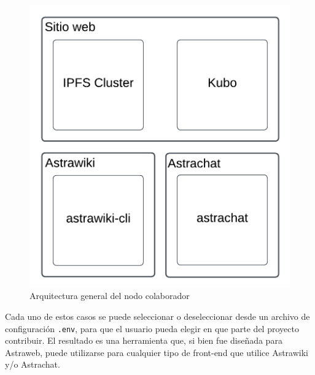 \begin{figure}[H]
    \centering
    \includegraphics[width=0.5\linewidth]{img/solucion-ipfs/collaborator-arch.png}
    \caption{Arquitectura general del nodo colaborador}
    \label{fig:collaborator-architecture}
\end{figure}

Cada uno de estos casos se puede seleccionar o deseleccionar desde un archivo de configuración \texttt{.env}, para que el usuario pueda elegir en que parte del proyecto contribuir. El resultado es una herramienta que, si bien fue diseñada para Astraweb, puede utilizarse para cualquier tipo de front-end que utilice Astrawiki y/o Astrachat.